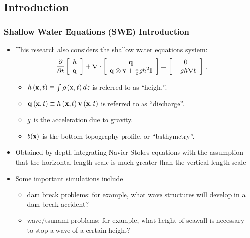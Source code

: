 \documentclass{beamer} \useoutertheme{infolines}
\begin{document}
\subsection{Introduction}
\begin{frame}
\frametitle{Shallow Water Equations (SWE) Introduction}

\begin{itemize}
  \item This research also considers the shallow water equations system:
    \begin{equation}
      \frac{\partial }{\partial t}\left[\begin{array}{c}h\\\mathbf{q}\end{array}\right]
        + \nabla\cdot\left[\begin{array}{c}\mathbf{q}\\
          \mathbf{q}\otimes\mathbf{v} + \frac{1}{2}gh^2 \mathbb{I}
          \end{array}\right]
        = \left[\begin{array}{c}0\\-gh\nabla b\end{array}
    \right] \,.
    \end{equation}
    \begin{itemize}
      \item $h\left(\mathbf{x},t\right) \equiv \int\rho\left(\mathbf{x},t\right) dz$ is referred to as ``height''.
      \item $\mathbf{q}\left(\mathbf{x},t\right) \equiv h\left(\mathbf{x},t\right)\mathbf{v}\left(\mathbf{x},t\right)$ is referred to
        as ``discharge''.
      \item $g$ is the acceleration due to gravity.
      \item $b(\mathbf{x})$ is the bottom topography profile,
        or ``bathymetry''.
    \end{itemize}
  \item Obtained by depth-integrating Navier-Stokes equations with the
    assumption that the horizontal length scale is much greater than the
    vertical length scale
  \item Some important simulations include
    \begin{itemize}
      \item \textcolor{secondarycolorheavy}{dam break problems}: for example, what wave
        structures will develop in a dam-break accident?
      \item \textcolor{secondarycolorheavy}{wave/tsunami problems}: for example, what height
        of seawall is necessary to stop a wave of a certain height?
    \end{itemize}
\end{itemize}

\end{frame}
\end{document}
